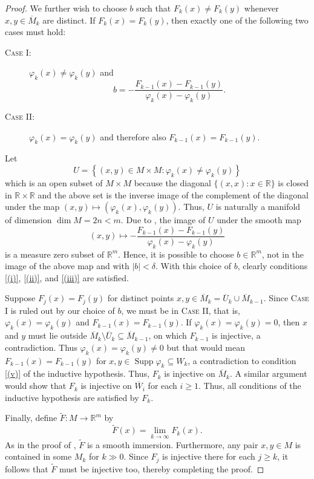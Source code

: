 \documentclass[11pt]{article}
\theoremstyle{thmstyle}
\theoremstyle{defstyle}
\newcommand{\R}{\mathbb{R}}
\newcommand{\Supp}{\operatorname{Supp}}
\newcommand{\wt}[1]{\widetilde{#1}}
\renewcommand{\ge}{\geqslant}
\begin{document}
\begin{proof}
	We further wish to choose $b$ such that $F_k(x)\ne F_k(y)$ whenever $x,y\in\overline M_k$ are distinct. If $F_k(x) = F_k(y)$, then exactly one of the following two cases must hold: 
	\begin{description}
		\item[{\scshape Case I}:] $\varphi_k(x)\ne \varphi_k(y)$ and 
		\begin{equation*}
			b = -\frac{F_{k - 1}(x) - F_{k - 1}(y)}{\varphi_k(x) - \varphi_k(y)}.
		\end{equation*}
		\item[{\scshape Case II}:] $\varphi_k(x) = \varphi_k(y)$ and therefore also $F_{k - 1}(x) = F_{k - 1}(y)$.
	\end{description}
	Let 
	\begin{equation*}
		U = \left\{(x, y)\in M\times M\colon \varphi_k(x)\ne\varphi_k(y)\right\}
	\end{equation*}
	which is an open subset of $M\times M$ because the diagonal $\{(x, x)\colon x\in \R\}$ is closed in $\R\times\R$ and the above set is the inverse image of the complement of the diagonal under the map $(x, y)\mapsto(\varphi_k(x), \varphi_k(y))$. Thus, $U$ is naturally a manifold of dimension $\dim M = 2n < m$. Due to , the image of $U$ under the smooth map 
	\begin{equation*}
		(x, y)\mapsto-\frac{F_{k - 1}(x) - F_{k - 1}(y)}{\varphi_k(x) - \varphi_k(y)}
	\end{equation*}
	is a measure zero subset of $\R^m$. Hence, it is possible to choose $b\in\R^m$, not in the image of the above map and with $|b| < \delta$. With this choice of $b$, clearly conditions \ref{(i)}, \ref{(ii)}, and \ref{(iii)} are satisfied.

	Suppose $F_j(x) = F_j(y)$ for distinct points $x, y\in\overline M_k = \overline U_k\cup\overline M_{k - 1}$. Since {\scshape Case I} is ruled out by our choice of $b$, we must be in {\scshape Case II}, that is, $\varphi_k(x) = \varphi_k(y)$ and $F_{k - 1}(x) = F_{k - 1}(y)$. If $\varphi_k(x) = \varphi_k(y) = 0$, then $x$ and $y$ must lie outside $\overline M_k\setminus\overline U_k\subseteq\overline M_{k - 1}$, on which $F_{k - 1}$ is injective, a contradiction. Thus $\varphi_k(x) = \varphi_k(y)\ne 0$ but that would mean $F_{k - 1}(x) = F_{k - 1}(y)$ for $x, y\in \Supp\varphi_k\subseteq W_{k}$, a contradiction to condition \ref{(v)} of the inductive hypothesis. Thus, $F_k$ is injective on $\overline M_k$. A similar argument would show that $F_k$ is injective on $\overline W_i$ for each $i\ge 1$. Thus, all conditions of the inductive hypothesis are satisfied by $F_k$.

	Finally, define $\wt F\colon M\to\R^m$ by 
	\begin{equation*}
		\wt F(x) = \lim_{k\to\infty} F_k(x).
	\end{equation*}
	As in the proof of , $\wt F$ is a smooth immersion. Furthermore, any pair $x, y\in M$ is contained in some $M_k$ for $k\gg 0$. Since $F_j$ is injective there for each $j\ge k$, it follows that $\wt F$ must be injective too, thereby completing the proof.
\end{proof}
\end{document}
